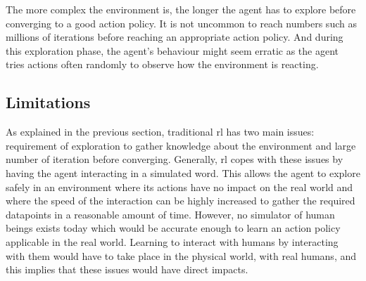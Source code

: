 	The more complex the environment is, the longer the agent has to explore before converging to a good action policy. It is not uncommon to reach numbers such as millions of iterations before reaching an appropriate action policy. And during this exploration phase, the agent's behaviour might seem erratic as the agent tries actions often randomly to observe how the environment is reacting.
	
	
\subsection{Limitations}

	As explained in the previous section, traditional \gls{rl} has two main issues: requirement of exploration to gather knowledge about the environment and large number of iteration before converging. Generally, \gls{rl} copes with these issues by having the agent interacting in a simulated word. This allows the agent to explore safely in an environment where its actions have no impact on the real world and where the speed of the interaction can be highly increased to gather the required datapoints in a reasonable amount of time. However, no simulator of human beings exists today which would be accurate enough to learn an action policy applicable in the real world. Learning to interact with humans by interacting with them would have to take place in the physical world, with real humans, and this implies that these issues would have direct impacts. 
	
